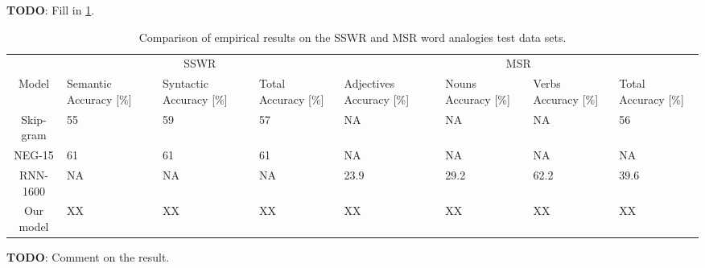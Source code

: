 \textbf{TODO}: Fill in \cref{table:word2vec-eval-empirical-results}.

\begin{table}[ht]
    \centering
    \begin{tabular}{@{}cm{1.75cm}m{1.75cm}m{1.75cm}m{1.75cm}m{1.75cm}m{1.75cm}m{1.75cm}@{}}
    \toprule
                            & \multicolumn{3}{c}{SSWR \cite{mikolov2013a}}                                                           & \multicolumn{4}{c}{MSR  \cite{mikolov-etal-2013-linguistic}}                                                                                    \\ \cmidrule(l){2-8} 
    \multirow{-2}{*}{Model} & Semantic Accuracy {[}\%{]} & Syntactic Accuracy {[}\%{]} & Total Accuracy {[}\%{]} & Adjectives Accuracy {[}\%{]} & Nouns Accuracy {[}\%{]} & Verbs Accuracy {[}\%{]} & Total Accuracy {[}\%{]} \\ \midrule
    \rowcolor[HTML]{F5F5F5}
    Skip-gram & 55 & 59 & 57 & NA & NA & NA & 56 \\
    NEG-15 & 61 & 61 & 61 & NA & NA & NA & NA \\
    \rowcolor[HTML]{F5F5F5}
    RNN-1600 & NA & NA & NA & 23.9 & 29.2 & 62.2 & 39.6 \\
    Our model & XX & XX & XX & XX & XX & XX & XX \\
    \bottomrule
    \end{tabular}
    \caption{Comparison of empirical results on the SSWR and MSR word analogies test data sets.}
    \label{table:word2vec-eval-empirical-results}
\end{table}

\textbf{TODO}: Comment on the result.
